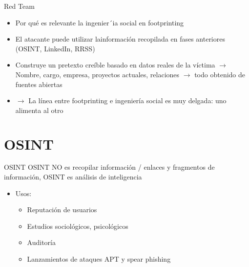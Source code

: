 \documentclass[aspectratio=169,11pt]{beamer}
\begin{document}
\begin{frame}[allowframebreaks]{Red Team}
\small
  \begin{itemize}
  \item Por qué es relevante la ingenier´ia social en footprinting
  \item El atacante puede utilizar lainformación recopilada en fases anteriores (OSINT, LinkedIn, RRSS)
  \item Construye un pretexto creíble basado en datos reales de la víctima $\rightarrow$ Nombre, cargo, empresa, proyectos actuales, relaciones $\rightarrow$ todo obtenido de fuentes abiertas
  \item $\rightarrow$ La línea entre footprinting e ingeniería social es muy delgada: uno alimenta al otro
  \end{itemize}
\end{frame}

\section{OSINT}


\begin{frame}[allowframebreaks]{OSINT}
OSINT NO es recopilar información / enlaces y fragmentos de información, OSINT es análisis de inteligencia
\small
  \begin{itemize}
  \item Usos:
\begin{itemize}
  \item Reputación de usuarios
  \item Estudios sociológicos, psicológicos
  \item Auditoría
  \item Lanzamientos de ataques APT y spear phishing
  \end{itemize}
  \end{itemize}
\end{frame}
\end{document}
